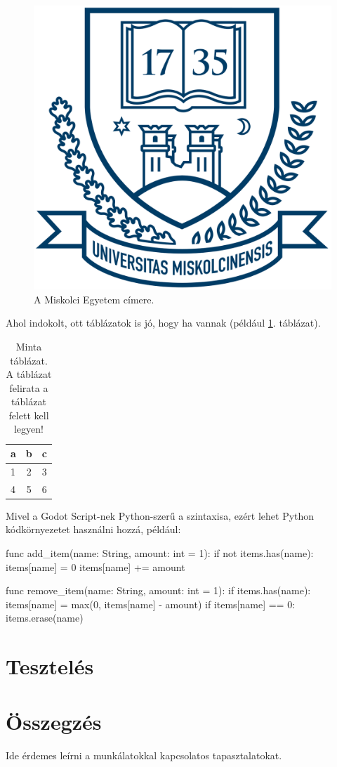 \documentclass[12pt,a4paper]{article}
\begin{document}
\begin{figure}[h]
	\centering
	\includegraphics[scale=0.1]{images/me_logo.png}
	\caption{A Miskolci Egyetem címere.}
	\label{fig:cimer}
\end{figure}

Ahol indokolt, ott táblázatok is jó, hogy ha vannak (például \ref{tab:minta}. táblázat).

\begin{table}[h]
	\centering
	\caption{Minta táblázat. A táblázat felirata a táblázat felett kell legyen!}
	\label{tab:minta}
	\begin{tabular}{l|c|c|}
		a & b & c \\
		\hline
		1 & 2 & 3 \\
		4 & 5 & 6 \\
		\hline
	\end{tabular}
\end{table}

Mivel a Godot Script-nek Python-szerű a szintaxisa, ezért lehet Python kódkörnyezetet használni hozzá, például:

\begin{python}
func add_item(name: String, amount: int = 1):
    if not items.has(name):
        items[name] = 0
        items[name] += amount

func remove_item(name: String, amount: int = 1):
    if items.has(name):
        items[name] = max(0, items[name] - amount)
        if items[name] == 0:
            items.erase(name)
\end{python}

\section{Tesztelés}

\section{Összegzés}

Ide érdemes leírni a munkálatokkal kapcsolatos tapasztalatokat.

\clearpage




\newpage


\end{document}
